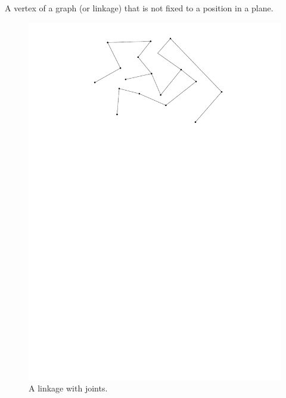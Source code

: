\begin{definition}\label{def:linkages-8}
A vertex of a graph (or linkage) that is not fixed to a position in a plane.
\end{definition} 
\begin{figure}[h]
\begin{center}
\includegraphics[scale=.5]{graphics/randomLinkage.pdf}
\end{center} 
\caption{A linkage with joints.}
\end{figure} 
